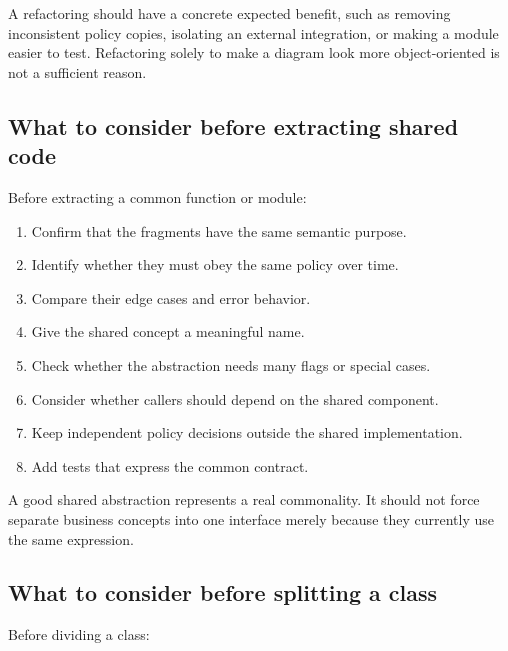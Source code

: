 \documentclass[12pt,a4paper]{article}
\begin{document}
A refactoring should have a concrete expected benefit, such as removing inconsistent policy copies, isolating an external integration, or making a module easier to test. Refactoring solely to make a diagram look more object-oriented is not a sufficient reason.

\subsection{What to consider before extracting shared code}

Before extracting a common function or module:

\begin{enumerate}

\item Confirm that the fragments have the same semantic purpose.

\item Identify whether they must obey the same policy over time.

\item Compare their edge cases and error behavior.

\item Give the shared concept a meaningful name.

\item Check whether the abstraction needs many flags or special cases.

\item Consider whether callers should depend on the shared component.

\item Keep independent policy decisions outside the shared implementation.

\item Add tests that express the common contract.

\end{enumerate}

A good shared abstraction represents a real commonality. It should not force separate business concepts into one interface merely because they currently use the same expression.

\subsection{What to consider before splitting a class}

Before dividing a class:
\end{document}
